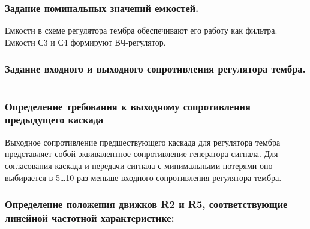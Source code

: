    \subsubsection{    Задание номинальных значений емкостей.}
   Емкости в схеме регулятора тембра обеспечивают его работу как фильтра.
   \begin{equation}
   \label{eq:equation5_9}
   
   \end{equation} 
   \begin{equation}
   \label{eq:equation5_10}
   
   \end{equation} 
        Емкости С3 и С4 формируют ВЧ-регулятор.
        \begin{equation}
   \label{eq:equation5_11}
   
   \end{equation} 
  \begin{equation}
   \label{eq:equation5_12}
  
  \end{equation} 
\subsubsection{   Задание входного и выходного сопротивления регулятора тембра.   }
\begin{equation}
   \label{eq:equation5_13}

\end{equation} 
\begin{equation}
   \label{eq:equation5_14}
   
   \end{equation}

\subsubsection{ Определение требования к выходному сопротивления предыдущего каскада   }

\begin{equation}
   \label{eq:equation5_15}
   
\end{equation}
Выходное сопротивление предшествующего каскада для регулятора тембра представляет собой эквивалентное сопротивление генератора сигнала. Для согласования каскада и передачи сигнала с минимальными потерями оно выбирается в 5…10 раз меньше входного сопротивления регулятора тембра.

\subsubsection{ Определение положения движков R2 и R5, соответствующие линейной частотной характеристике:}

